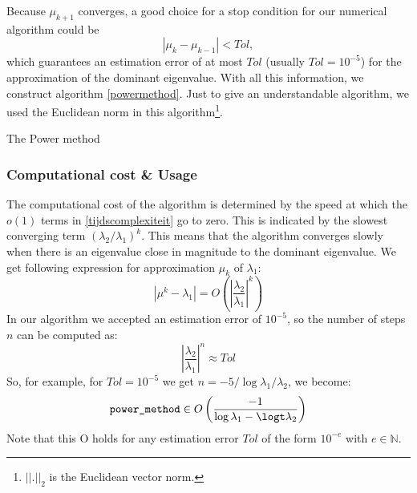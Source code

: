 \documentclass[a4paper,11pt]{report}
\newcommand{\N}{{\mathbb N}}
\begin{document}
Because $\mu_{k+1}$ converges, a good choice for a stop condition for our numerical algorithm could be 
$$|\mu_k - \mu_{k-1}| < Tol,$$
which guarantees an estimation error of at most $Tol$ (usually $Tol=10^{-5}$) for the approximation of the dominant eigenvalue. With all this information, we construct algorithm \ref{powermethod}. Just to give an understandable algorithm, we 
used the Euclidean norm in this algorithm\footnote{$||.||_2$ is the Euclidean vector norm.}. 


\begin{algorithm}[H]
 \blankline
{}

 
 \caption{The Power method}\label{powermethod}
\end{algorithm}

\subsubsection{Computational cost \& Usage}
The computational cost of the algorithm is determined by the speed at which the 
$o(1)$ terms in \ref{tijdscomplexiteit} go to zero. This is indicated by the slowest converging term $(\lambda_2/\lambda_1)^k$. This means
that  the algorithm converges slowly when there is an eigenvalue close in magnitude to the dominant eigenvalue. We 
get following expression for approximation $\mu_k$ of $\lambda_1$:
$$|\mu^k - \lambda_1| = O\left(\left|\frac{\lambda_2}{\lambda_1} \right|^k\right)$$
In our algorithm we accepted an estimation error of $10^{-5}$, so the number of 
steps $n$ can be computed as:
$$\left|\frac{\lambda_2}{\lambda_1} \right|^n \approx Tol$$
So, for example, for $Tol = 10^{-5}$ we get $n = -5/\log{\lambda_1/\lambda_2}$, we become:
$$\text{\texttt{power\_method}} \in O\left(\frac{-1}{\log{\lambda_1 - \logt\lambda_2}}\right)$$
Note that this O holds for any estimation error $Tol$ of the form $10^{-e}$ with $e \in \N$. 
\end{document}
